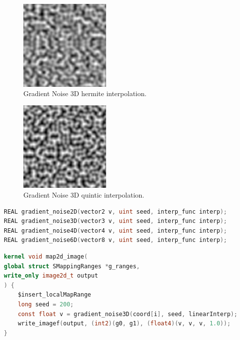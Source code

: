 \begin{figure}[h]
\centering
\includegraphics[width=0.4\textwidth]{out/noise_functions/gradient_noise3D_hermiteInterp.png}
\caption{Gradient Noise 3D hermite interpolation.}
\label{fig:gradient_noise3D_hermiteInterp}
\end{figure}

\begin{figure}[h]
\centering
\includegraphics[width=0.4\textwidth]{out/noise_functions/gradient_noise2D_quinticInterp.png}
\caption{Gradient Noise 3D quintic interpolation.}
\label{fig:gradient_noise2D_quinticInterp}
\end{figure}

\begin{lstlisting}[caption={Definition of gradient noise functions},label={lst:gradient_noise_definition},language=OpenCL]
REAL gradient_noise2D(vector2 v, uint seed, interp_func interp);
REAL gradient_noise3D(vector3 v, uint seed, interp_func interp);
REAL gradient_noise4D(vector4 v, uint seed, interp_func interp);
REAL gradient_noise6D(vector8 v, uint seed, interp_func interp);
\end{lstlisting}

\begin{lstlisting}[caption={Example for gradient noise functions},label={lst:gradient_noise_example},language=OpenCL]
kernel void map2d_image(
global struct SMappingRanges *g_ranges,
write_only image2d_t output
) {
    $insert_localMapRange
    long seed = 200;
    const float v = gradient_noise3D(coord[i], seed, linearInterp);
    write_imagef(output, (int2)(g0, g1), (float4)(v, v, v, 1.0));
}
\end{lstlisting}

